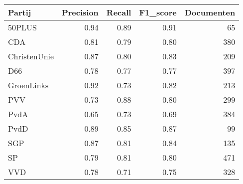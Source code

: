 \begin{tabular}{lrrrr}
\toprule
       Partij &  Precision &  Recall &  F1\_score &  Documenten \\
\midrule
       50PLUS &       0.94 &    0.89 &      0.91 &          65 \\
          CDA &       0.81 &    0.79 &      0.80 &         380 \\
 ChristenUnie &       0.87 &    0.80 &      0.83 &         209 \\
          D66 &       0.78 &    0.77 &      0.77 &         397 \\
   GroenLinks &       0.92 &    0.73 &      0.82 &         213 \\
          PVV &       0.73 &    0.88 &      0.80 &         299 \\
         PvdA &       0.65 &    0.73 &      0.69 &         384 \\
         PvdD &       0.89 &    0.85 &      0.87 &          99 \\
          SGP &       0.87 &    0.81 &      0.84 &         135 \\
           SP &       0.79 &    0.81 &      0.80 &         471 \\
          VVD &       0.78 &    0.71 &      0.75 &         328 \\
\bottomrule
\end{tabular}

